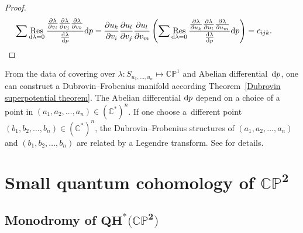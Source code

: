 \documentclass[pdftex]{sigma}
\numberwithin{equation}{section}
\DeclareMathOperator*{\res}{Res}
\begin{document}
\begin{proof}
\begin{gather*}
\sum \res_{{\rm d}\lambda=0} \frac{\frac{\partial\lambda}{\partial v_i}\frac{\partial\lambda}{\partial v_j} \frac{\partial\lambda}{\partial v_k}}{\frac{{\rm d}\lambda}{{\rm d}p} }{\rm d}p=\frac{\partial u_k}{\partial v_i}\frac{\partial u_l}{\partial v_j}\frac{\partial u_l}{\partial v_m}\left(\sum \res_{{\rm d}\lambda=0} \frac{\frac{\partial\lambda}{\partial u_k}\frac{\partial\lambda}{\partial u_l} \frac{\partial\lambda}{\partial u_m}}{\frac{{\rm d}\lambda}{{\rm d}p} }{\rm d}p\right)=c_{ijk}.\tag*{\qed}
\end{gather*}
\renewcommand{\qed}{}
\end{proof}

\begin{Remark}
From the data of covering over $\lambda\colon S_{u_1,\dots, u_n}\mapsto\mathbb{CP}^1$ and Abelian differential~${\rm d}p$, one can construct a Dubrovin--Frobenius manifold according Theorem~\ref{Dubrovin superpotential theorem}. The Abelian differential ${\rm d}p$ depend on a choice of a point in $(a_1,a_2,\dots,a_n)\in(\mathbb{C}^{*})^n$. If one choose a~different point~${(b_1,b_2,\dots,b_n)\in(\mathbb{C}^{*})^n}$, the Dubrovin--Frobenius structures of $(a_1,a_2,\dots,a_n)$ and $(b_1,b_2,\dots,b_n)$ are related by a Legendre transform. See \cite[Appendix B, Chapter 5]{B.Dubrovin2} for details.
\end{Remark}

\section[Small quantum cohomology of $\mathbb{CP}^2$]{Small quantum cohomology of $\boldsymbol{\mathbb{CP}^2}$}\label{small Quantum Cohomolology}

\subsection[Monodromy of $\mathbb{CP}^2$]{Monodromy of $\boldsymbol{QH^{*}\bigl(\mathbb{CP}^2\bigr)}$}
\end{document}
